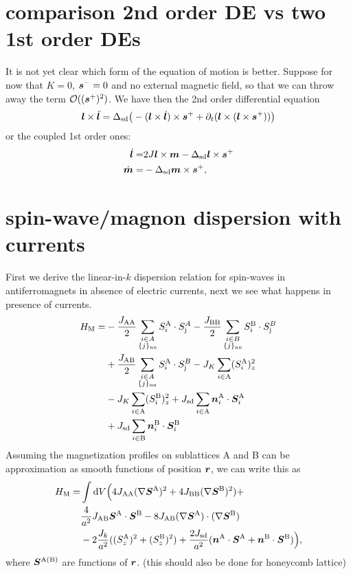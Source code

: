 \section{comparison 2nd order DE vs two 1st order DEs}
It is not yet clear which form of the equation of motion is better. Suppose for now that $K=0$, $\boldsymbol{s}^-=0$ and no external magnetic field, so that we can throw away the term $\mathcal{O}((\boldsymbol{s}^+)^2)$. We have then the 2nd order differential equation
\begin{align}
    \boldsymbol{l}\times\ddot{\boldsymbol{l}}  = \Delta_\text{sd}\big(
    -(\boldsymbol{l}\times\dot{\boldsymbol{l}})\times\boldsymbol{s}^+ +\partial_t (\boldsymbol{l}\times(\boldsymbol{l}\times\boldsymbol{s}^+))
    \big)
\end{align}
or the coupled 1st order ones:
\begin{align}
    \dot{\boldsymbol{l}}  = & 2J \boldsymbol{l}\times\boldsymbol{m}  
     -\Delta_\text{sd} \boldsymbol{l}\times\boldsymbol{s}^+ \\
    \dot {\boldsymbol{m}} = & -\Delta_\text{sd}\boldsymbol{m}\times\boldsymbol{s}^+ ,
\end{align}
\section{spin-wave/magnon dispersion with currents}
First we derive the linear-in-$k$ dispersion relation for spin-waves in antiferromagnets in absence of electric currents, next we see what happens in presence of currents. 
\begin{align}
    H_\text{M} =& -\frac{J_\text{AA}}{2}\sum_{\substack{i\in A \\ \{j\}_\text{nn}}} S_i^\text{A} \cdot S_\text{j}^A -\frac{J_\text{BB}}{2}\sum_{\substack{i\in B \\ \{j\}_\text{nn}}} S_i^\text{B} \cdot S_\text{j}^B \nonumber\\
    & + \frac{J_\text{AB}}{2}\sum_{\substack{i\in A \\ \{j\}_\text{nn}}} S_i^\text{A} \cdot S_\text{j}^B
    - J_K \sum_{i\in\text{A}} (S^\text{A}_i)^2_z \nonumber\\
    &- J_K \sum_{i\in\text{A}}(S^\text{B}_i)_z^2 + J_\text{sd}\sum_{i\in \text{A}}\boldsymbol{n}_i^\text{A}\cdot \boldsymbol{S}^\text{A}_i\nonumber\\
    &+ J_\text{sd}\sum_{i\in \text{B}}\boldsymbol{n}_i^\text{B}\cdot \boldsymbol{S}^\text{B}_i
\end{align}
Assuming the magnetization profiles on sublattices A and B can be approximation as smooth functions of position $\boldsymbol{r}$, we can write this as
\begin{align}
    H_\text{M} =& \int \mathrm{d}V \Big(4J_\text{AA} (\nabla \boldsymbol{S}^\text{A})^2+4J_\text{BB}(\nabla \boldsymbol{S}^\text{B})^2)+\nonumber\\
    & \frac{4}{a^2} J_\text{AB}\boldsymbol{S}^\text{A}\cdot\boldsymbol{S}^\text{B}-8J_\text{AB}(\nabla\boldsymbol{S}^\text{A})\cdot(\nabla\boldsymbol{S}^\text{B})\nonumber\\
    &- 2\frac{J_k}{a^2} ((S_z^\text{A})^2+(S_z^\text{B})^2)+\frac{2J_\text{sd}}{a^2}(\boldsymbol{n}^\text{A}\cdot\boldsymbol{S}^\text{A}+\boldsymbol{n}^\text{B}\cdot\boldsymbol{S}^\text{B})\Big),
\end{align}
where $\boldsymbol{S}^\text{A(B)}$ are functions of $\boldsymbol{r}$. (this should also be done for honeycomb lattice)

